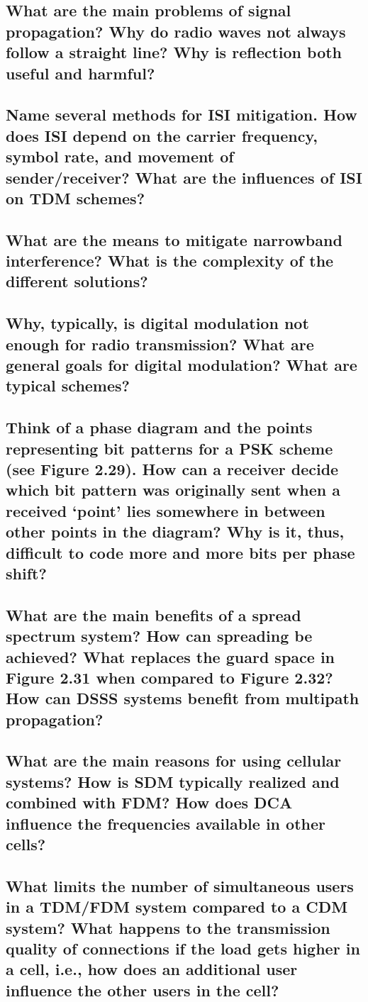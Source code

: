 \subsection{What are the main problems of signal propagation? Why do radio waves not always
follow a straight line? Why is reflection both useful and harmful?}

\subsection{Name several methods for ISI mitigation. How does ISI depend on the carrier
frequency, symbol rate, and movement of sender/receiver? What are the influences
of ISI on TDM schemes?}

\subsection{What are the means to mitigate narrowband interference? What is the complexity of
the different solutions?}

\subsection{Why, typically, is digital modulation not enough for radio transmission? What are
general goals for digital modulation? What are typical schemes?}

\subsection{Think of a phase diagram and the points representing bit patterns for a PSK scheme
(see Figure 2.29). How can a receiver decide which bit pattern was originally sent
when a received ‘point’ lies somewhere in between other points in the diagram? Why
is it, thus, difficult to code more and more bits per phase shift?}

\subsection{What are the main benefits of a spread spectrum system? How can spreading be
achieved? What replaces the guard space in Figure 2.31 when compared to Figure
2.32? How can DSSS systems benefit from multipath propagation?}

\subsection{What are the main reasons for using cellular systems? How is SDM typically realized
and combined with FDM? How does DCA influence the frequencies available in other
cells?}

\subsection{What limits the number of simultaneous users in a TDM/FDM system compared to a
CDM system? What happens to the transmission quality of connections if the load
gets higher in a cell, i.e., how does an additional user influence the other users in the
cell?}



